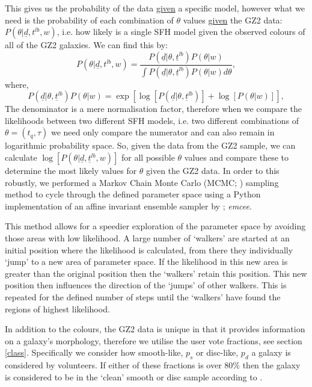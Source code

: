 \documentclass{mn2e}
\begin{document}
This gives us the probability of the data \underline{given} a specific model, however what we need is the probability of each combination of $\theta$ values \underline{given} the GZ2 data: $P(\theta|\underline{d}, t^{lb}, w)$, i.e. how likely is a single SFH model given the observed colours of all of the GZ2 galaxies. We can find this by:
\begin{equation*}
P(\theta|\underline{d}, t^{lb}, w) = \frac{P(\underline{d}|\theta, \underline{t}^{lb})P(\theta | w)}{\int P(\underline{d}|\theta, \underline{t}^{lb})P(\theta | w) d\theta},
\end{equation*}
where,
\begin{equation*}
P(\underline{d}|\theta, \underline{t}^{lb})P(\theta | w) = \exp{\left[\log{[P(\underline{d}|\theta, \underline{t}^{lb})]} + \log{[P(\theta | w)]}\right]},
\end{equation*}
The denominator is a mere normalisation factor, therefore when we compare the likelihoods between two different SFH models, i.e. two different combinations of $\theta = (t_{q}, \tau)$ we need only compare the numerator and can also remain in logarithmic probability space. So, given the data from the GZ2 sample, we can calculate $\log[P(\theta|\underline{d}, \underline{t}^{lb}, w)]$ for all possible $\theta$ values and compare these to determine the most likely values for $\theta$ given the GZ2 data. In order to this robustly, we performed a Markov Chain Monte Carlo (MCMC; \citealt{MacKay, Dan, GW10}) sampling method to cycle through the defined parameter space using a Python implementation of an affine invariant ensemble sampler by \cite{Dan}; \emph{emcee}.

This method allows for a speedier exploration of the parameter space by avoiding those areas with low likelihood. A large number of `walkers' are started at an initial position where the likelihood is calculated, from there they individually `jump' to a new area of parameter space. If the likelihood in this new area is greater than the original position then the `walkers' retain this position. This new position then influences the direction of the  `jumps' of other walkers.  This is repeated for the defined number of steps until the `walkers' have found the regions of highest likelihood.

In addition to the colours, the GZ2 data is unique in that it provides information on a galaxy's morphology, therefore we utilise the user vote fractions, see section \ref{class}. Specifically we consider how smooth-like, $p_s$ or disc-like, $p_d$ a galaxy is considered by volunteers. If either of these fractions is over $80\%$ then the galaxy is considered to be in the `clean' smooth or disc sample according to \citet{GZ2}. 
\end{document}
